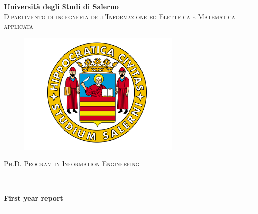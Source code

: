 \begin{titlepage}

\newcommand{\HRule}{\rule{\linewidth}{0.5mm}} %

\center %
 

\textbf{\huge Università degli Studi di Salerno}\\[0.6cm] %
\textsc{\Large Dipartimento di ingegneria dell'Informazione ed Elettrica e Matematica applicata}\\[0.2cm]

\begin{figure}[H]
\centering
\includegraphics[width = 0.6\linewidth]{Figures/logo.png}
\end{figure}
\textsc{\Large Ph.D. Program in Information Engineering}\\[0.4cm] %


\HRule \\[0.8cm]
{ \huge \bfseries First year report}\\[0.3cm] %
\HRule \\[1.5cm]
 


\end{titlepage}

